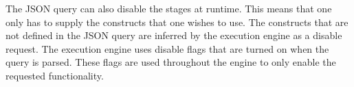 The JSON query can also disable the stages at runtime.  This means
that one only has to supply the constructs that one wishes to use.  The
constructs that are not defined in the JSON query are inferred by the
execution engine as a disable request. The execution engine uses disable flags
that are turned on when the query is parsed. These flags are used throughout
the engine to only enable the requested functionality.

